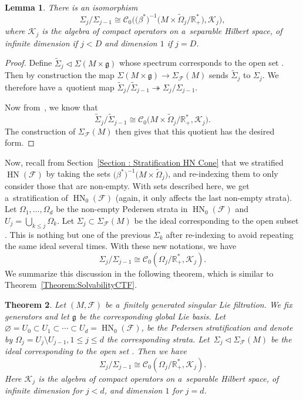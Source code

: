 \documentclass[pdftex]{sigma}
\newcommand{\R}{\mathbb R} %
\newcommand{\CCC}{\mathscr{C}} %
\newcommand{\F}{\mathcal{F}} %
\newcommand{\g}{\mathfrak{g}} %
\newcommand{\HN}{\operatorname{HN}} %
\newcommand{\Fb}{\mathcal{F}} %
\numberwithin{equation}{section}
\newtheorem{thm}{Theorem}[section]
\newtheorem{lem}[thm]{Lemma}
\theoremstyle{definition}
\begin{document}
\begin{lem}
 There is an isomorphism
 \[{\Sigma_j}/{\Sigma_{j-1}} \cong \CCC_0\bigl(\bigl(\beta^*\bigr)^{-1}\bigl( M\times {\widetilde{\Omega}_j}/{\R^*_+}\bigr), \mathcal{K}_j\bigr),\]
 where $\mathcal{K}_j$ is the algebra of compact operators on a~separable Hilbert space, of infinite dimension if $j < D$ and dimension $1$ if $j = D$.
\end{lem}
\begin{proof}
 Define $\widetilde{\Sigma}_j \triangleleft \Sigma(M \times \g)$ whose spectrum corresponds to the open set \smash{$M\times {\widetilde{U}_j}/{\R^*_+}$}. Then by construction the map $\Sigma(M \times \g) \to \Sigma_{\Fb}(M)$ sends $\widetilde{\Sigma}_j$ to $\Sigma_j$. We therefore have a~quotient map
${\widetilde{\Sigma}_j}/{\widetilde{\Sigma}_{j-1}}\twoheadrightarrow {\Sigma_j}/{\Sigma_{j-1}}$.

 Now from~\cite[Theorem 5.16]{CrenFilteredCrossedProduct}, we know that
 \[{\widetilde{\Sigma}_j}/{\widetilde{\Sigma}_{j-1}} \cong \CCC_0\bigl( M\times {\widetilde{\Omega}_j}/{\R^*_+}, \mathcal{K}_j\bigr).\]
 The construction of $\Sigma_{\Fb}(M)$ then gives that this quotient has the desired form.
\end{proof}

Now, recall from Section~\ref{Section : Stratification HN Cone} that we stratified $\HN(\Fb)$ by taking the sets $\bigl(\beta^*\bigr)^{-1}\bigl( M\times \widetilde{\Omega}_j\bigr)$,
and re-indexing them to only consider those that are non-empty. With sets described here, we get a~stratification of $\HN_0(\Fb)$ (again, it only affects the last non-empty strata).
Let $\Omega_1, \dots, \Omega_d$ be the non-empty Pedersen strata in $\HN_0(\Fb)$ and $U_j = \bigcup_{k\leq j}\Omega_k$. Let $\Sigma_j \subset \Sigma_{\F}(M)$ be the ideal corresponding to the open subset \smash{${U_j}/{\R^*_+}$}. This is nothing but one of the previous $\Sigma_k$ after re-indexing to avoid repeating the same ideal several times. With these new notations, we have
\[{\Sigma_j}/{\Sigma_{j-1}} \cong \CCC_0 ({\Omega_j}/{\R^*_+}, \mathcal{K}_j ).\]
We summarize this discussion in the following theorem, which is similar to Theorem~\ref{Theorem:SolvabilityCTF}.

\begin{thm}
 Let $(M,\F)$ be a~finitely generated singular Lie filtration. We fix generators and let $\g$ be the corresponding global Lie basis. Let $\varnothing = U_0 \subset U_1 \subset \cdots \subset U_d = \HN_0(\F)$,
 be the Pedersen stratification and denote by $\Omega_j = U_j\setminus U_{j-1}, 1\leq j \leq d$ the corresponding strata. Let~${\Sigma_j\triangleleft \Sigma_{\F}(M)}$ be the ideal corresponding to the open set \smash{${U_j}/{\R^*_+}$}. Then we have
 \[{\Sigma_j}/{\Sigma_{j-1}} \cong \CCC_0 ({\Omega_j}/{\R^*_+},\mathcal{K}_j).\]
 Here $\mathcal{K}_j$ is the algebra of compact operators on a~separable Hilbert space, of infinite dimension for $j < d$, and dimension $1$ for $j = d$.
\end{thm}
\end{document}
